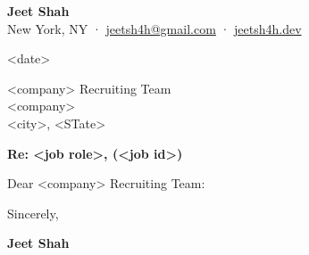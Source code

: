 \documentclass[letterpaper,11pt]{article}
\begin{document}
\begin{center}
  {\fontsize{24}{28}\selectfont\bfseries Jeet Shah}\\[4pt]
  {\color{muted}New York, NY \enspace·\enspace
  \href{mailto:jeetsh4h@gmail.com}{jeetsh4h@gmail.com} \enspace·\enspace
  \href{https://jeetsh4h.dev}{jeetsh4h.dev}}
\end{center}

\vspace{8pt}

<date>

<company> Recruiting Team\\
<company>\\
<city>, <STate>

\textbf{Re: <job role>, (<job id>)}

Dear <company> Recruiting Team:


Sincerely,

\textbf{Jeet Shah}
\end{document}
